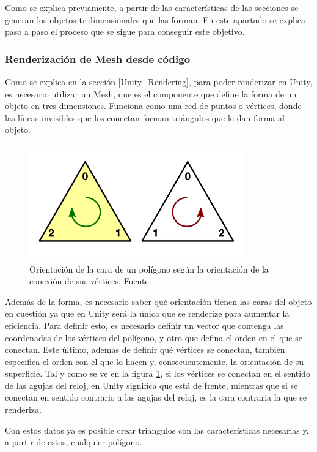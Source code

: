 \documentclass[../main.tex]{subfiles}
\begin{document}
Como se explica previamente, a partir de las características de las secciones se generan los objetos tridimensionales que las forman. En este apartado se explica paso a paso el proceso que se sigue para conseguir este objetivo.

\subsubsection{Renderización de Mesh desde código}

Como se explica en la sección \ref{Unity_Rendering}, para poder renderizar en Unity, es necesario utilizar un Mesh, que es el componente que define la forma de un objeto en tres dimensiones. Funciona como una red de puntos o vértices, donde las líneas invisibles que los conectan forman triángulos que le dan forma al objeto. 

\begin{figure}[h!]
\centering
\includegraphics[width=9.25cm, height=5cm]{imagenes/Triangle_Render.png}
\caption{Orientación de la cara de un polígono según la orientación de la conexión de sus vértices. Fuente:\cite{Unity_Render}}
\label{fig:Triangle_Render}
\end{figure}

Además de la forma, es necesario saber qué orientación tienen las caras del objeto en cuestión ya que en Unity será la única que se renderize para aumentar la eficiencia. Para definir esto, es necesario definir un vector que contenga las coordenadas de los vértices del polígono, y otro que defina el orden en el que se conectan. Este último, además de definir qué vértices se conectan, también especifica el orden con el que lo hacen y, consecuentemente, la orientación de su superficie. Tal y como se ve en la figura \ref{fig:Triangle_Render}, si los vértices se conectan en el sentido de las agujas del reloj, en Unity significa que está de frente, mientras que si se conectan en sentido contrario a las agujas del reloj, es la cara contraria la que se renderiza.

Con estos datos ya es posible crear triángulos con las características necesarias y, a partir de estos, cualquier polígono. 
\end{document}
